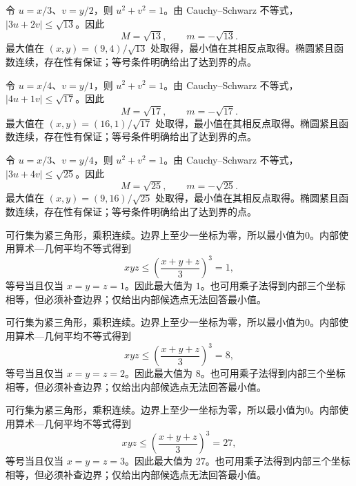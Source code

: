 \documentclass[UTF8,12pt,a4paper,fontset=fandol]{ctexart}
\begin{document}
\begin{solve}\label{ans:c35q4}
令 $u=x/3$、$v=y/2$，则 $u^2+v^2=1$。由 Cauchy--Schwarz 不等式，$|3u+2v|\le\sqrt{13}$。因此
\[
M=\sqrt{13},\qquad m=-\sqrt{13}.
\]
最大值在 $(x,y)=(9,4)/\sqrt{13}$ 处取得，最小值在其相反点取得。椭圆紧且函数连续，存在性有保证；等号条件明确给出了达到界的点。
\end{solve}

\begin{solve}\label{ans:c35q5}
令 $u=x/4$、$v=y/1$，则 $u^2+v^2=1$。由 Cauchy--Schwarz 不等式，$|4u+1v|\le\sqrt{17}$。因此
\[
M=\sqrt{17},\qquad m=-\sqrt{17}.
\]
最大值在 $(x,y)=(16,1)/\sqrt{17}$ 处取得，最小值在其相反点取得。椭圆紧且函数连续，存在性有保证；等号条件明确给出了达到界的点。
\end{solve}

\begin{solve}\label{ans:c35q6}
令 $u=x/3$、$v=y/4$，则 $u^2+v^2=1$。由 Cauchy--Schwarz 不等式，$|3u+4v|\le\sqrt{25}$。因此
\[
M=\sqrt{25},\qquad m=-\sqrt{25}.
\]
最大值在 $(x,y)=(9,16)/\sqrt{25}$ 处取得，最小值在其相反点取得。椭圆紧且函数连续，存在性有保证；等号条件明确给出了达到界的点。
\end{solve}

\begin{solve}\label{ans:c35q7}
可行集为紧三角形，乘积连续。边界上至少一坐标为零，所以最小值为0。内部使用算术—几何平均不等式得到
\[
xyz\le\left(\frac{x+y+z}3\right)^3=1,
\]
等号当且仅当 $x=y=z=1$。因此最大值为 $1$。也可用乘子法得到内部三个坐标相等，但必须补查边界；仅给出内部候选点无法回答最小值。
\end{solve}

\begin{solve}\label{ans:c35q8}
可行集为紧三角形，乘积连续。边界上至少一坐标为零，所以最小值为0。内部使用算术—几何平均不等式得到
\[
xyz\le\left(\frac{x+y+z}3\right)^3=8,
\]
等号当且仅当 $x=y=z=2$。因此最大值为 $8$。也可用乘子法得到内部三个坐标相等，但必须补查边界；仅给出内部候选点无法回答最小值。
\end{solve}

\begin{solve}\label{ans:c35q9}
可行集为紧三角形，乘积连续。边界上至少一坐标为零，所以最小值为0。内部使用算术—几何平均不等式得到
\[
xyz\le\left(\frac{x+y+z}3\right)^3=27,
\]
等号当且仅当 $x=y=z=3$。因此最大值为 $27$。也可用乘子法得到内部三个坐标相等，但必须补查边界；仅给出内部候选点无法回答最小值。
\end{solve}
\end{document}

